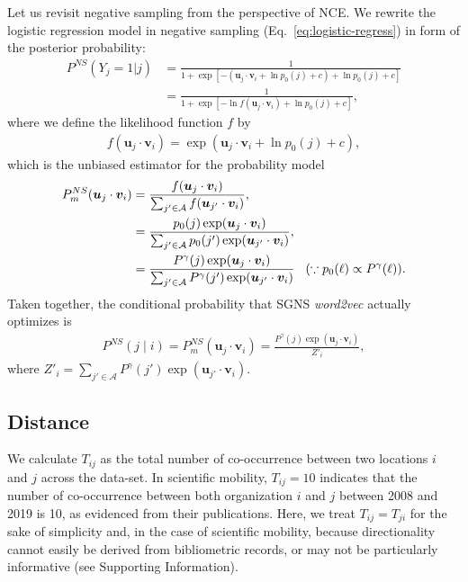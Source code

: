 \documentclass[12pt]{article} %
\newcommand{\vect}[1]{\boldsymbol{#1}}
\def\given{\mid}
\def\SI{Supporting Information}
\begin{document}
Let us revisit negative sampling from the perspective of NCE.
We rewrite the logistic regression model in negative sampling (Eq.~\ref{eq:logistic-regress}) in form of the posterior probability:
\begin{align}
	P^{NS}\left(Y_{j}=1 \vert j\right) & = \frac{
		1
	}{
		1 + \exp\left[ - \left( \vect{u}_j \cdot \vect{v}_{i} + \ln p_0(j) + c \right) + \ln p_0(j) + c \right]
	}                                             \\
	                                   & = \frac{
		1
	}{
		1 + \exp\left[ - \ln f(\vect{u}_j \cdot \vect{v}_{i}) + \ln p_0(j) + c \right]
	},
\end{align}
where we define the likelihood function $f$ by
\begin{align}
	f(\vect{u}_j \cdot \vect{v}_{i}) = \exp\left( \vect{u}_j \cdot \vect{v}_{i} + \ln p_0(j) + c\right),
\end{align}
which is the unbiased estimator for the probability model
\begin{align}
	\label{eq:unbiasef}
	P_m^{NS}(\vect{u}_j \cdot \vect{v}_{i}) & = \frac{ f(\vect{u}_j \cdot \vect{v}_{i}) }{\sum_{ j' \in {\cal A}} f(\vect{u}_{j'} \cdot \vect{v}_{i}) },                                                                                               \\
	                                        & = \frac{  p_0(j)\exp( \vect{u}_j \cdot \vect{v}_{i} ) }{\sum_{j' \in \mathcal{A}}  p_0(j') \exp(\vect{u}_{j'} \cdot \vect{v}_{i})},                                                                      \\
	                                        & = \frac{  P^\gamma(j)\exp( \vect{u}_j \cdot \vect{v}_{i} ) }{\sum_{j' \in \mathcal{A}}  P^\gamma(j') \exp(\vect{u}_{j'} \cdot \vect{v}_{i})} \hspace{0.3cm}(\because p_0(\ell) \propto P^\gamma (\ell)).
\end{align}
Taken together, the conditional probability that SGNS \textit{word2vec} actually optimizes is
\begin{align}
	P^{NS}(j\given i) = P_m^{NS}(\vect{u}_j \cdot \vect{v}_{i})  =  \frac{  P^\gamma(j)\exp( \vect{u}_j \cdot \vect{v}_{i} ) }{Z'_i},
\end{align}
where $Z'_i=\sum_{j' \in \mathcal{A}}  P^\gamma(j') \exp(\vect{u}_{j'} \cdot \vect{v}_{i})$.




%
%
\subsection*{Distance}
We calculate $T_{ij}$ as the total number of co-occurrence between two locations $i$ and $j$ across the data-set.
In scientific mobility, $T_{ij} = 10$ indicates that the number of co-occurrence between both organization $i$ and $j$ between 2008 and 2019 is 10, as evidenced from their publications.
Here, we treat $T_{ij} = T_{ji}$ for the sake of simplicity and, in the case of scientific mobility, because directionality cannot easily be derived from bibliometric records, or may not be particularly informative (see \SI).
\end{document}
